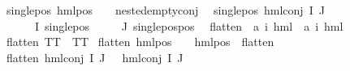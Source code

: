 \begin{isabellebody}
{\isachardoublequoteopen}single{\isacharunderscore}{\kern0pt}pos\ {\isacharparenleft}{\kern0pt}hml{\isacharunderscore}{\kern0pt}pos\ {\isacharunderscore}{\kern0pt}\ {\isasympsi}{\isacharparenright}{\kern0pt}{\isachardoublequoteclose}\ \ {\isachardoublequoteopen}nested{\isacharunderscore}{\kern0pt}empty{\isacharunderscore}{\kern0pt}conj\ {\isasympsi}{\isachardoublequoteclose}\ {\isacharbar}{\kern0pt}\isanewline
{\isachardoublequoteopen}single{\isacharunderscore}{\kern0pt}pos\ {\isacharparenleft}{\kern0pt}hml{\isacharunderscore}{\kern0pt}conj\ I\ J\ {\isasymPhi}{\isacharparenright}{\kern0pt}{\isachardoublequoteclose}\isanewline
{}\ {\isachardoublequoteopen}{\isasymforall}{\isasymphi}\ {\isasymin}\ {\isacharparenleft}{\kern0pt}{\isasymPhi}\ {\isacharbackquote}{\kern0pt}\ I{\isacharparenright}{\kern0pt}{\isachardot}{\kern0pt}\ {\isacharparenleft}{\kern0pt}single{\isacharunderscore}{\kern0pt}pos\ {\isasymphi}{\isacharparenright}{\kern0pt}{\isachardoublequoteclose}\isanewline
{\isachardoublequoteopen}{\isasymforall}{\isasymphi}\ {\isasymin}\ {\isacharparenleft}{\kern0pt}{\isasymPhi}\ {\isacharbackquote}{\kern0pt}\ J{\isacharparenright}{\kern0pt}{\isachardot}{\kern0pt}\ single{\isacharunderscore}{\kern0pt}pos{\isacharunderscore}{\kern0pt}pos\ {\isasymphi}{\isachardoublequoteclose}\isanewline
\isanewline
\isanewline
{}\isamarkupfalse%
\ flatten\ {\isacharcolon}{\kern0pt}{\isacharcolon}{\kern0pt}\ {\isachardoublequoteopen}{\isacharparenleft}{\kern0pt}{\isacharprime}{\kern0pt}a{\isacharcomma}{\kern0pt}\ {\isacharprime}{\kern0pt}i{\isacharparenright}{\kern0pt}\ hml\ {\isasymRightarrow}\ {\isacharparenleft}{\kern0pt}{\isacharprime}{\kern0pt}a{\isacharcomma}{\kern0pt}\ {\isacharprime}{\kern0pt}i{\isacharparenright}{\kern0pt}\ hml{\isachardoublequoteclose}\ \isanewline
{\isachardoublequoteopen}flatten\ TT\ {\isacharequal}{\kern0pt}\ TT{\isachardoublequoteclose}\ {\isacharbar}{\kern0pt}\isanewline
{\isachardoublequoteopen}flatten\ {\isacharparenleft}{\kern0pt}hml{\isacharunderscore}{\kern0pt}pos\ {\isasymalpha}\ {\isasympsi}{\isacharparenright}{\kern0pt}\ {\isacharequal}{\kern0pt}\ {\isacharparenleft}{\kern0pt}hml{\isacharunderscore}{\kern0pt}pos\ {\isasymalpha}\ {\isacharparenleft}{\kern0pt}flatten\ {\isasympsi}{\isacharparenright}{\kern0pt}{\isacharparenright}{\kern0pt}{\isachardoublequoteclose}\ {\isacharbar}{\kern0pt}\isanewline
{\isachardoublequoteopen}flatten\ {\isacharparenleft}{\kern0pt}hml{\isacharunderscore}{\kern0pt}conj\ I\ J\ {\isasymPhi}{\isacharparenright}{\kern0pt}\ {\isacharequal}{\kern0pt}\ {\isacharparenleft}{\kern0pt}hml{\isacharunderscore}{\kern0pt}conj\ I\ J\ {\isasymPhi}{\isacharparenright}{\kern0pt}{\isachardoublequoteclose}\isanewline

\end{isabellebody}
